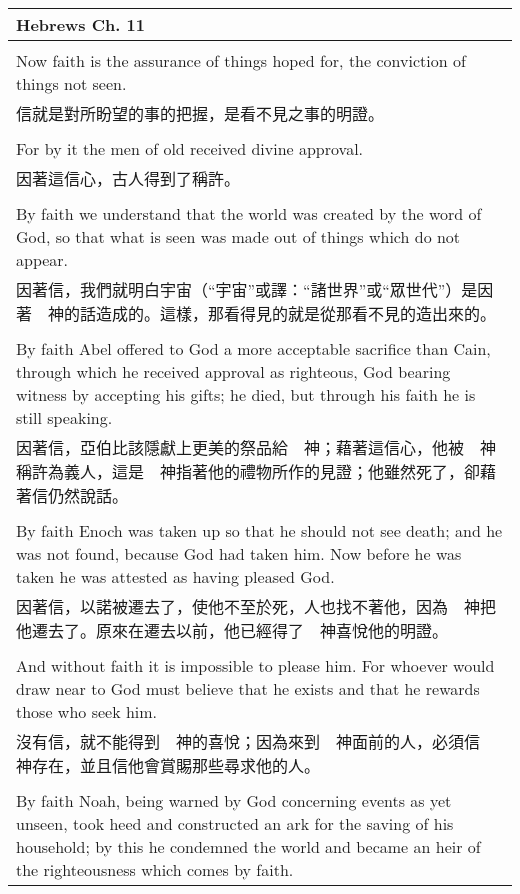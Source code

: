 \begin{tabularx}{\textwidth}{p{}}
\hline
Hebrews Ch. 11 \\
\hline \\
Now faith is the assurance of things hoped for, the conviction of things not seen. \\
信就是對所盼望的事的把握，是看不見之事的明證。 \\ \\
For by it the men of old received divine approval. \\
因著這信心，古人得到了稱許。 \\ \\
By faith we understand that the world was created by the word of God, so that what is seen was made out of things which do not appear. \\
因著信，我們就明白宇宙（“宇宙”或譯：“諸世界”或“眾世代”）是因著　神的話造成的。這樣，那看得見的就是從那看不見的造出來的。 \\ \\
By faith Abel offered to God a more acceptable sacrifice than Cain, through which he received approval as righteous, God bearing witness by accepting his gifts; he died, but through his faith he is still speaking. \\
因著信，亞伯比該隱獻上更美的祭品給　神；藉著這信心，他被　神稱許為義人，這是　神指著他的禮物所作的見證；他雖然死了，卻藉著信仍然說話。 \\ \\
By faith Enoch was taken up so that he should not see death; and he was not found, because God had taken him. Now before he was taken he was attested as having pleased God. \\
因著信，以諾被遷去了，使他不至於死，人也找不著他，因為　神把他遷去了。原來在遷去以前，他已經得了　神喜悅他的明證。 \\ \\
And without faith it is impossible to please him. For whoever would draw near to God must believe that he exists and that he rewards those who seek him. \\
沒有信，就不能得到　神的喜悅；因為來到　神面前的人，必須信　神存在，並且信他會賞賜那些尋求他的人。 \\ \\
By faith Noah, being warned by God concerning events as yet unseen, took heed and constructed an ark for the saving of his household; by this he condemned the world and became an heir of the righteousness which comes by faith. \\

\end{tabularx}
